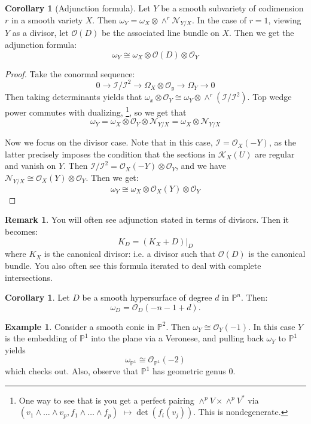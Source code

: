 \documentclass[10pt,reqno]{amsart}
\theoremstyle{definition}
\newtheorem{corollary}[theorem]{Corollary}
\newtheorem{example}[theorem]{Example}
\newtheorem{remark}[theorem]{Remark}
\theoremstyle{remark}
\numberwithin{equation}{section}
\numberwithin{theorem}{section}
\newcommand{\OO}{{\mathcal O}}
\newcommand{\KK}{{\mathscr K}}
\newcommand{\NN}{{\mathscr N}}
\newcommand{\II}{{\mathscr I}}
\newcommand{\PP}{{\mathbb P}}
\begin{document}
\begin{corollary}[Adjunction formula]
Let $Y$ be a smooth subvariety of codimension $r$ in a smooth variety $X$. Then $\omega_Y = \omega_X \otimes \wedge^r \NN_{Y/X}$. In the case of $r=1$, viewing $Y$ as a divisor, let $\OO(D)$ be the associated line bundle on $X$. Then we get the adjunction formula:
 \[\omega_Y \cong \omega_X \otimes \OO(D) \otimes \OO_Y\]
\end{corollary}
\begin{proof}
Take the conormal sequence:
\[0 \to \II/\II^2 \to \Omega_X \otimes \OO_y \to \Omega_Y \to 0\]
Then taking determinants yields that $\omega_x \otimes \OO_Y \cong \omega_Y \otimes \wedge^r(\II/\II^2).$ Top wedge power commutes with dualizing, \footnote{One way to see that is you get a perfect pairing $\wedge^p V \times \wedge^p V^*$ via $(v_1 \wedge \dots \wedge v_p, f_1 \wedge \dots \wedge f_p)$ $\mapsto \det(f_i(v_j))$. This is nondegenerate.}, so we get that
\[\omega_Y = \omega_X \otimes \OO_Y \otimes \NN_{Y/X} = \omega_X \otimes \NN_{Y/X} \]

Now we focus on the divisor case. Note that in this case, $\II = \OO_X(-Y)$, as the latter precisely imposes the condition that the sections in $\KK_X(U)$ are regular and vanish on $Y$. Then $\II/\II^2 = \OO_X(-Y) \otimes \OO_Y$, and we have $\NN_{Y/X} \cong \OO_X(Y) \otimes \OO_Y$. Then we get:
\[\omega_Y \cong \omega_X \otimes \OO_X(Y) \otimes \OO_Y\]
\end{proof}

\begin{remark} You will often see adjunction stated in terms of divisors. Then it becomes:
\[K_D = (K_X + D)|_D\]
where $K_X$ is the canonical divisor: i.e. a divisor such that $\OO(D)$ is the canonical bundle. You also often see this formula iterated to deal with complete intersections.
\end{remark}

\begin{corollary} Let $D$ be a smooth hypersurface of degree $d$ in $\PP^n$. Then:
\[\omega_D = \OO_{D}(-n-1+d).\]
\end{corollary}

\begin{example} Consider a smooth conic in $\PP^2$. Then $\omega_Y \cong \OO_Y(-1)$. In this case $Y$ is the embedding of $\PP^1$ into the plane via a Veronese, and pulling back $\omega_Y$ to $\PP^1$ yields
\[\omega_{\PP^1} \cong \OO_{\PP^1}(-2)\]
which checks out. Also, observe that $\PP^1$ has geometric genus 0.
\end{example}
\end{document}
